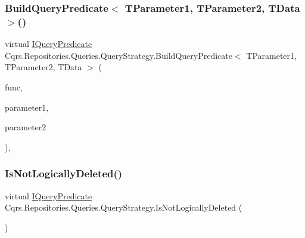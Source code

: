 \subsubsection{\texorpdfstring{Build\+Query\+Predicate$<$ T\+Parameter1, T\+Parameter2, T\+Data $>$()}{BuildQueryPredicate< TParameter1, TParameter2, TData >()}}
{\footnotesize\ttfamily virtual \hyperlink{interfaceCqrs_1_1Repositories_1_1Queries_1_1IQueryPredicate}{I\+Query\+Predicate} Cqrs.\+Repositories.\+Queries.\+Query\+Strategy.\+Build\+Query\+Predicate$<$ T\+Parameter1, T\+Parameter2, T\+Data $>$ (\begin{DoxyParamCaption}\item[{Func$<$ T\+Parameter1, T\+Parameter2, T\+Data $>$}]{func,  }\item[{T\+Parameter1}]{parameter1,  }\item[{T\+Parameter2}]{parameter2 }\end{DoxyParamCaption})\hspace{0.3cm}{\ttfamily [protected]}, {\ttfamily [virtual]}}

\mbox{\label{classCqrs_1_1Repositories_1_1Queries_1_1QueryStrategy_ab1841119fbbb58337d55b014a8b260b4}} 
\subsubsection{\texorpdfstring{Is\+Not\+Logically\+Deleted()}{IsNotLogicallyDeleted()}}
{\footnotesize\ttfamily virtual \hyperlink{interfaceCqrs_1_1Repositories_1_1Queries_1_1IQueryPredicate}{I\+Query\+Predicate} Cqrs.\+Repositories.\+Queries.\+Query\+Strategy.\+Is\+Not\+Logically\+Deleted (\begin{DoxyParamCaption}{ }\end{DoxyParamCaption})\hspace{0.3cm}{\ttfamily [virtual]}}

\mbox{\label{classCqrs_1_1Repositories_1_1Queries_1_1QueryStrategy_a96f4657370c8cd0d20465d2855ea2fd7}} 
